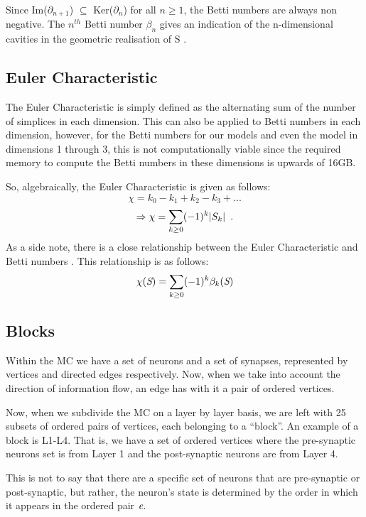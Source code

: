 Since Im($\partial_{n+1}$) $\subseteq$ Ker($\partial_n$) for all $n\geq 1$, the Betti numbers are always non negative. The $n^{th}$ Betti number $\beta_n$ gives an indication of the n-dimensional cavities in the geometric realisation of S \cite{Reimann_2017}.

\subsection{Euler Characteristic}
The Euler Characteristic is simply defined as the alternating sum of the number of simplices in each dimension. This can also be applied to Betti numbers in each dimension, however, for the Betti numbers for our models and even the \ER model in dimensions 1 through 3, this is not computationally viable since the required memory to compute the Betti numbers in these dimensions is upwards of 16GB.

So, algebraically, the Euler Characteristic is given as follows:
\begin{equation*}
    \chi = k_0 - k_1 + k_2 - k_3 + ...
\end{equation*}
\begin{equation}
    \Rightarrow \chi = \sum_{k \geq 0} (-1)^k \abs{S_k} \enspace{.}
\end{equation}
As a side note, there is a close relationship between the Euler Characteristic and Betti numbers \cite{Reimann_2017}. This relationship is as follows:
\begin{equation}
    \chi(\emph{S}) = \sum_{k\geq 0}(-1)^k \beta_{k}(\emph{S})
\end{equation}


\subsection{Blocks}
Within the MC we have a set of neurons and a set of synapses, represented by vertices and directed edges respectively. Now, when we take into account the direction of information flow, an edge has with it a pair of ordered vertices.

Now, when we subdivide the MC on a layer by layer basis, we are left with 25 subsets of ordered pairs of vertices, each belonging to a ``block''. An example of a block is L1-L4. That is, we have a set of ordered vertices where the pre-synaptic neurons set is from Layer 1 and the post-synaptic neurons are from Layer 4.

This is not to say that there are a specific set of neurons that are pre-synaptic or post-synaptic, but rather, the neuron's state is determined by the order in which it appears in the ordered pair $\emph{e}$.


